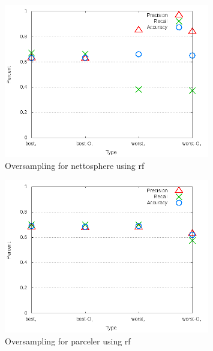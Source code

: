 \begin{figure}[!t]
\centering
\includegraphics[width=0.8\textwidth]{images/rf/test_4/nettosphere_sample_range.png}
\caption{Oversampling for nettosphere using \gls{rf}}
\label{fig:test_4_nettosphere_rf}
\end{figure}

\begin{figure}[!t]
\centering
\includegraphics[width=0.8\textwidth]{images/rf/test_4/parceler_sample_range.png}
\caption{Oversampling for parceler using \gls{rf}}
\label{fig:test_4_parceler_rf}
\end{figure}

